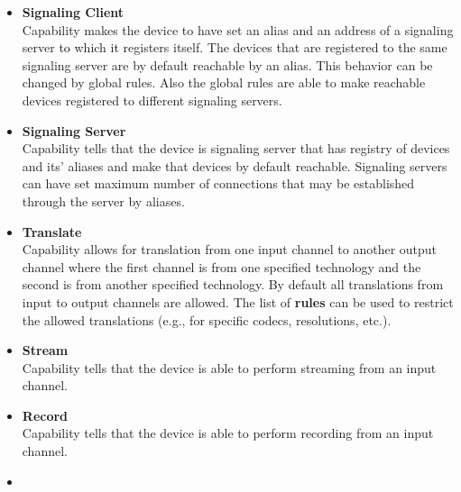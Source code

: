 \begin{itemize}
\item \textbf{Signaling Client} \\
  Capability makes the device to have set an alias 
  and an address of a signaling server to which it registers itself.
  The devices that are registered to the same signaling server are by
  default reachable by an alias. This behavior can be changed by global rules. 
  Also the global rules are able to make reachable devices registered to 
  different signaling servers.

\item \textbf{Signaling Server} \\
  Capability tells that the device is signaling server
  that has registry of devices and its' aliases and make that devices by 
  default reachable. Signaling servers can have set maximum number of 
  connections that may be established through the server by aliases.

\item \textbf{Translate}  \\
  Capability allows for translation from one input channel to another output 
  channel where the first channel is from one specified technology and the 
  second is from another specified technology. By default all translations 
  from input to output channels are allowed. The list of \textbf{rules} can be 
  used to restrict the allowed translations (e.g., for specific codecs, 
  resolutions, etc.).

\item \textbf{Stream}  \\
  Capability tells that the device is able to perform streaming from an input 
  channel.

\item \textbf{Record}  \\
  Capability tells that the device is able to perform recording from an input 
  channel.
  
\item {}
 \\ 
 \\ 
\end{itemize}

